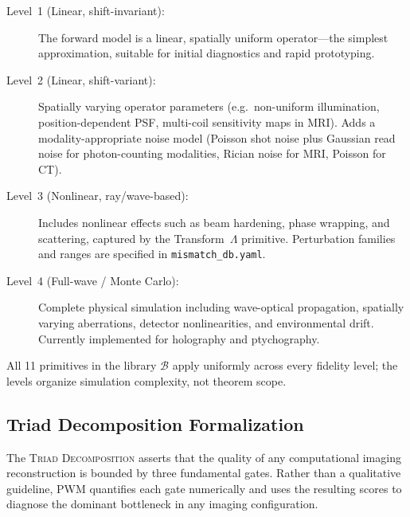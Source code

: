 \documentclass[11pt]{article}
\newcommand{\Blib}{\mathcal{B}}
\newcommand{\triad}{\textsc{Triad Decomposition}}
\begin{document}
\begin{description}
  \item[Level~1 (Linear, shift-invariant):]  The forward model is a
    linear, spatially uniform operator---the simplest approximation,
    suitable for initial diagnostics and rapid prototyping.
  \item[Level~2 (Linear, shift-variant):]  Spatially varying operator
    parameters (e.g.\ non-uniform illumination, position-dependent PSF,
    multi-coil sensitivity maps in MRI).  Adds a modality-appropriate
    noise model (Poisson shot noise plus Gaussian read noise for
    photon-counting modalities, Rician noise for MRI, Poisson for CT).
  \item[Level~3 (Nonlinear, ray/wave-based):]  Includes nonlinear
    effects such as beam hardening, phase wrapping, and scattering,
    captured by the Transform~$\Lambda$ primitive.
    Perturbation families and ranges are specified in
    \texttt{mismatch\_db.yaml}.
  \item[Level~4 (Full-wave / Monte Carlo):]  Complete physical
    simulation including wave-optical propagation, spatially varying
    aberrations, detector nonlinearities, and environmental drift.
    Currently implemented for holography and ptychography.
\end{description}

\noindent All 11 primitives in the library $\Blib$ apply uniformly across every fidelity level; the levels organize simulation complexity, not theorem scope.


\subsection*{Triad Decomposition Formalization}
\label{sec:methods:triad}

The \triad{} asserts that the quality of any computational imaging
reconstruction is bounded by three fundamental gates.  Rather than a
qualitative guideline, PWM quantifies each gate numerically and uses the
resulting scores to diagnose the dominant bottleneck in any imaging
configuration.
\end{document}
